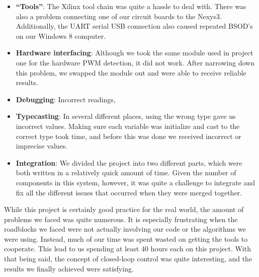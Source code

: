 \documentclass[11pt]{article}
\begin{document}
		\begin{itemize}				
		\item \textbf{``Tools''}: The Xilinx tool chain was quite a hassle to deal with.  There was also a problem connecting one of our circuit boards to the Nexys3.  Additionally, the UART serial USB connection also caused repeated BSOD's on our Windows 8 computer.
		\item \textbf{Hardware interfacing}: Although we took the same module used in project one for the hardware PWM detection, it did not work.  After narrowing down this problem, we swapped the module out and were able to receive reliable results.
		\item \textbf{Debugging}: Incorrect readings, 
		\item \textbf{Typecasting}: In several different places, using the wrong type gave us incorrect values.  Making sure each variable was initialize and cast to the correct type took time, and before this was done we received incorrect or imprecise values.
		\item \textbf{Integration}: We divided the project into two different parts, which were both written in a relatively quick amount of time.  Given the number of components in this system, however, it was quite a challenge to integrate and fix all the different issues that occurred when they were merged together. 
		\end{itemize}

While this project is certainly good practice for the real world, the amount of problems we faced was quite numerous.  It is especially frustrating when the roadblocks we faced were not actually involving our code or the algorithms we were using.  Instead, much of our time was spent wasted on getting the tools to cooperate.  This lead to us spending at least 40 hours each on this project.  With that being said, the concept of closed-loop control was quite interesting, and the results we finally achieved were satisfying. 
	
\end{document}
